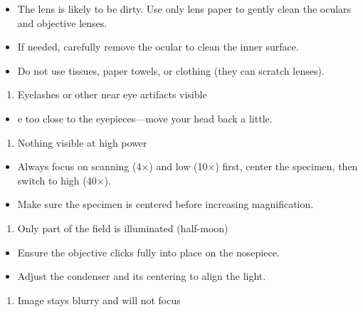 \documentclass[
  letterpaper,
  DIV=11,
  numbers=noendperiod]{scrreprt}
\providecommand{\tightlist}{%
  \setlength{\itemsep}{0pt}\setlength{\parskip}{0pt}}
\begin{document}
\begin{itemize}
\item
  The lens is likely to be dirty. Use only lens paper to gently clean
  the oculars and objective lenses.
\item
  If needed, carefully remove the ocular to clean the inner surface.
\item
  Do not use tissues, paper towels, or clothing (they can scratch
  lenses).
\end{itemize}

\begin{enumerate}
\def\labelenumi{\arabic{enumi}.}
\setcounter{enumi}{3}
\tightlist
\item
  Eyelashes or other near eye artifacts visible
\end{enumerate}

\begin{itemize}
\tightlist
\item
  e too close to the eyepieces---move your head back a little.
\end{itemize}

\begin{enumerate}
\def\labelenumi{\arabic{enumi}.}
\setcounter{enumi}{4}
\tightlist
\item
  Nothing visible at high power
\end{enumerate}

\begin{itemize}
\item
  Always focus on scanning (4×) and low (10×) first, center the
  specimen, then switch to high (40×).
\item
  Make sure the specimen is centered before increasing magnification.
\end{itemize}

\begin{enumerate}
\def\labelenumi{\arabic{enumi}.}
\setcounter{enumi}{5}
\tightlist
\item
  Only part of the field is illuminated (half-moon)
\end{enumerate}

\begin{itemize}
\item
  Ensure the objective clicks fully into place on the nosepiece.
\item
  Adjust the condenser and its centering to align the light.
\end{itemize}

\begin{enumerate}
\def\labelenumi{\arabic{enumi}.}
\setcounter{enumi}{6}
\tightlist
\item
  Image stays blurry and will not focus
\end{enumerate}
\end{document}
